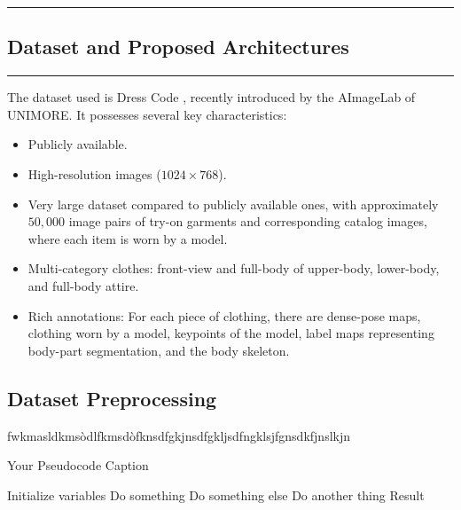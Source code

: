 {\color{gray}\hrule}
\begin{center}
\section{Dataset and Proposed Architectures}
\end{center}
{\color{gray}\hrule}

The dataset used is Dress Code \cite{dress-code}, recently introduced by the AImageLab of UNIMORE. It possesses several key characteristics:

\begin{itemize}[noitemsep]

\item Publicly available.

\item High-resolution images ($1024 \times 768$).

\item Very large dataset compared to publicly available ones, with approximately $50,000$ image pairs of try-on garments and corresponding catalog images, where each item is worn by a model.

\item Multi-category clothes: front-view and full-body of upper-body, lower-body, and full-body attire.

\item Rich annotations: For each piece of clothing, there are dense-pose maps, clothing worn by a model, keypoints of the model, label maps representing body-part segmentation, and the body skeleton.

\end{itemize}

\subsection{Dataset Preprocessing}
 fwkmasldkmsòdlfkmsdòfknsdfgkjnsdfgkljsdfngklsjfgnsdkfjnslkjn
 
 
\begin{algorithm}
\caption{Your Pseudocode Caption}
\begin{algorithmic}[1] %
    \State Initialize variables
        \State Do something
            \State Do something else
        \Else
            \State Do another thing
        \EndIf
    \EndWhile
    \State \Return Result
\EndProcedure
\end{algorithmic}
\end{algorithm}
